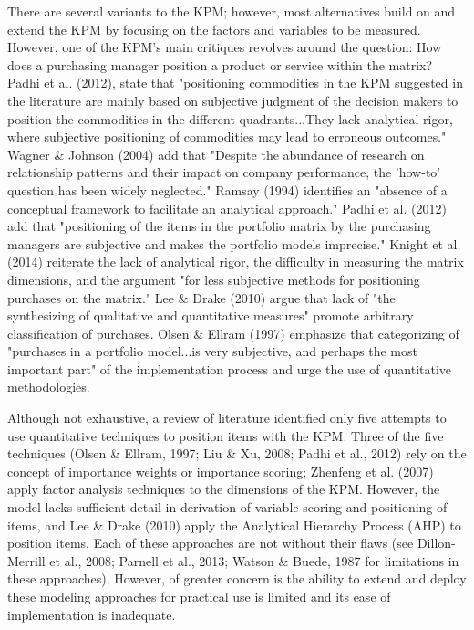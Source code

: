 \documentclass[twocolumn]{svjour3}       %
\begin{document}
There are several variants to the KPM; however, most alternatives build on and extend the KPM by focusing on the factors and variables to be measured.  However, one of the KPM's main critiques revolves around the question: How does a purchasing manager position a product or service within the matrix? Padhi et al. (2012), state that "positioning commodities in the KPM suggested in the literature are mainly based on subjective judgment of the decision makers to position the commodities in the different quadrants...They lack analytical rigor, where subjective positioning of commodities may lead to erroneous outcomes." Wagner \& Johnson (2004) add that "Despite the abundance of research on relationship patterns and their impact on company performance, the 'how-to' question has been widely neglected." Ramsay (1994) identifies an "absence of a conceptual framework to facilitate an analytical approach." Padhi et al. (2012) add that "positioning of the items in the portfolio matrix by the purchasing managers are subjective and makes the portfolio models imprecise." Knight et al. (2014) reiterate the lack of analytical rigor, the difficulty in measuring the matrix dimensions, and the argument "for less subjective methods for positioning purchases on the matrix." Lee \& Drake (2010) argue that lack of "the synthesizing of qualitative and quantitative measures" promote arbitrary classification of purchases. Olsen \& Ellram (1997) emphasize that categorizing of "purchases in a portfolio model...is very subjective, and perhaps the most important part" of the implementation process and urge the use of quantitative methodologies.

Although not exhaustive, a review of literature identified only five attempts to use quantitative techniques to position items with the KPM. Three of the five techniques (Olsen \& Ellram, 1997; Liu \& Xu, 2008; Padhi et al., 2012) rely on the concept of importance weights or importance scoring; Zhenfeng et al. (2007) apply factor analysis techniques to the dimensions of the KPM. However, the model lacks sufficient detail in derivation of variable scoring and positioning of items, and Lee \& Drake (2010) apply the Analytical Hierarchy Process (AHP) to position items. Each of these approaches are not without their flaws (see Dillon-Merrill et al., 2008; Parnell et al., 2013; Watson \& Buede, 1987 for limitations in these approaches). However, of greater concern is the ability to extend and deploy these modeling approaches for practical use is limited and its ease of implementation is inadequate. 
\end{document}
